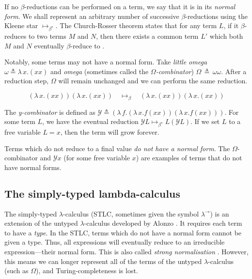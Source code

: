 If no $\beta$-reductions can be performed on a term, we say that it is in its \textit{normal form}.
We shall represent an arbitrary number of successive $\beta$-reductions using the Kleene star
$\mapsto_{\beta^{\star}}$. The Church-Rosser theorem states that for any term $L$, if it
$\beta$-reduces to two terms $M$ and $N$, then there exists a common term $L'$ which both $M$ and
$N$ eventually $\beta$-reduce to \citep{church_properties_1936}.

Notably, some terms may not have a normal form. Take \textit{little omega} $\omega \triangleq
\lambda \, x. (x x)$ and \textit{omega} (sometimes called the $\Omega$\textit{-combinator}) $\Omega
\, \triangleq \, \omega \omega$. After a reduction step, $\Omega$ will remain unchanged and we can
perform the same reduction.

\begin{equation*}
  (\lambda \, x. (x x)) (\lambda \, x. (x x)) \quad
  \mapsto_{\beta} \quad (\lambda \, x. (x x)) (\lambda \, x. (x x))
\end{equation*}

The \textit{y-combinator} is defined as $\mathcal{Y} \triangleq (\lambda \, f. (\lambda \, x. f (x x
)) (\lambda \, x. f (xx)))$. For some term $L$, we have the eventual reduction $\mathcal{Y} L
\mapsto_{\beta^{\star}} L (\mathcal{Y} L)$. If we set $L$ to a free variable $L = x$, then the term
will grow forever.

Terms which do not reduce to a final value \textit{do not have a normal form}. The $\Omega$-
combinator and $\mathcal{Y} x$ (for some free variable $x$) are examples of terms that do not have
normal forms.

\subsection{The simply-typed lambda-calculus}
The simply-typed $\lambda$-calculus (STLC, sometimes given the symbol $\lambda^{\rightarrow}$) is an
extension of the untyped $\lambda$-calculus developed by Alonzo \citet{church_formulation_1940}. It
requires each term to have a \textit{type}. In the STLC, terms which do not have a normal form
cannot be given a type. Thus, all expressions will eventually reduce to an irreducible
expression---their normal form. This is also called \textit{strong normalisation}
\citep{pierce_types_2002}. However, this means we can longer represent all of the terms of the
untyped $\lambda$-calculus (such as $\Omega$), and Turing-completeness is lost.

